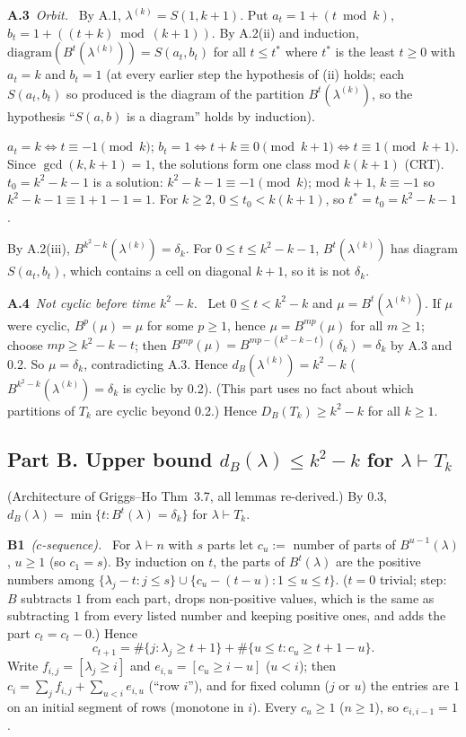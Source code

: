 \documentclass[11pt]{article}
\newcommand{\step}[2]{\par\medskip\noindent\textbf{#1}\ \textit{#2}\ }
\newcommand{\DB}{D_B}
\newcommand{\dB}{d_B}
\newcommand{\Iv}[1]{[#1]}
\begin{document}
\step{A.3}{Orbit.} By A.1, $\lambda^{(k)}=S(1,k+1)$. Put $a_t=1+(t\bmod k)$, $b_t=1+((t+k)\bmod(k+1))$. By A.2(ii) and induction, $\mathrm{diagram}(B^t(\lambda^{(k)}))=S(a_t,b_t)$ for all $t\le t^*$ where $t^*$ is the least $t\ge0$ with $a_t=k$ and $b_t=1$ (at every earlier step the hypothesis of (ii) holds; each $S(a_t,b_t)$ so produced is the diagram of the partition $B^t(\lambda^{(k)})$, so the hypothesis ``$S(a,b)$ is a diagram'' holds by induction).

$a_t=k\iff t\equiv-1\pmod k$; $b_t=1\iff t+k\equiv0\pmod{k+1}\iff t\equiv1\pmod{k+1}$. Since $\gcd(k,k+1)=1$, the solutions form one class mod $k(k+1)$ (CRT). $t_0=k^2-k-1$ is a solution: $k^2-k-1\equiv-1\pmod k$; mod $k+1$, $k\equiv-1$ so $k^2-k-1\equiv1+1-1=1$. For $k\ge2$, $0\le t_0<k(k+1)$, so $t^*=t_0=k^2-k-1$.

By A.2(iii), $B^{k^2-k}(\lambda^{(k)})=\delta_k$. For $0\le t\le k^2-k-1$, $B^t(\lambda^{(k)})$ has diagram $S(a_t,b_t)$, which contains a cell on diagonal $k+1$, so it is not $\delta_k$.

\step{A.4}{Not cyclic before time $k^2-k$.} Let $0\le t<k^2-k$ and $\mu=B^t(\lambda^{(k)})$. If $\mu$ were cyclic, $B^p(\mu)=\mu$ for some $p\ge1$, hence $\mu=B^{mp}(\mu)$ for all $m\ge1$; choose $mp\ge k^2-k-t$; then $B^{mp}(\mu)=B^{mp-(k^2-k-t)}(\delta_k)=\delta_k$ by A.3 and 0.2. So $\mu=\delta_k$, contradicting A.3. Hence $\dB(\lambda^{(k)})=k^2-k$ ($B^{k^2-k}(\lambda^{(k)})=\delta_k$ is cyclic by 0.2).
(This part uses no fact about which partitions of $T_k$ are cyclic beyond 0.2.) Hence $\DB(T_k)\ge k^2-k$ for all $k\ge1$.

\subsection*{Part B. Upper bound $\dB(\lambda)\le k^2-k$ for $\lambda\vdash T_k$}

(Architecture of Griggs--Ho Thm~3.7, all lemmas re-derived.)
By 0.3, $\dB(\lambda)=\min\{t: B^t(\lambda)=\delta_k\}$ for $\lambda\vdash T_k$.

\step{B1}{($c$-sequence).} For $\lambda\vdash n$ with $s$ parts let $c_u:=$ number of parts of $B^{u-1}(\lambda)$, $u\ge1$ (so $c_1=s$). By induction on $t$, the parts of $B^t(\lambda)$ are the positive numbers among $\{\lambda_j-t: j\le s\}\cup\{c_u-(t-u): 1\le u\le t\}$. ($t=0$ trivial; step: $B$ subtracts $1$ from each part, drops non-positive values, which is the same as subtracting $1$ from every listed number and keeping positive ones, and adds the part $c_t=c_t-0$.) Hence
\[
c_{t+1}=\#\{j:\lambda_j\ge t+1\}+\#\{u\le t: c_u\ge t+1-u\}.\tag{$*$}
\]
Write $f_{i,j}=\Iv{\lambda_j\ge i}$ and $e_{i,u}=\Iv{c_u\ge i-u}$ ($u<i$); then $c_i=\sum_j f_{i,j}+\sum_{u<i}e_{i,u}$ (``row $i$''), and for fixed column ($j$ or $u$) the entries are $1$ on an initial segment of rows (monotone in $i$). Every $c_u\ge1$ ($n\ge1$), so $e_{i,i-1}=1$.
\end{document}
